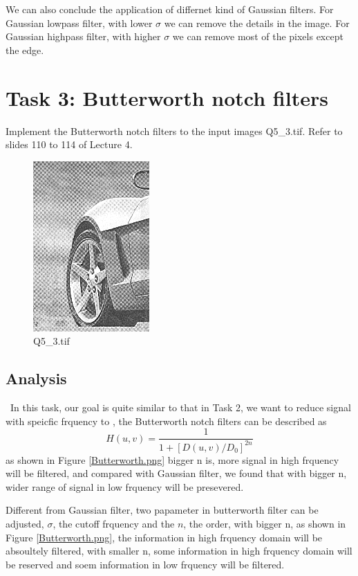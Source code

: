 \documentclass[
	12pt, %
]{style/fphw}
\begin{document}
We can also conclude the application of differnet kind of Gaussian filters. For Gaussian lowpass filter, with lower $\sigma$ we can remove the details in the image. For Gaussian highpass filter, with higher $\sigma$ we can remove most of the pixels except the edge.

\newpage
\section*{Task 3: Butterworth notch filters}

\begin{problem}
Implement the Butterworth notch filters to the input images Q5\_3.tif. Refer to slides 110 to 114 of Lecture 4.

\begin{figure}[H]
    \centering
    \includegraphics[width=0.3\linewidth]{plots/Q5_3.png}
    \caption{Q5\_3.tif}
    \label{Q5_3.tif}
\end{figure}

\end{problem}

\subsection*{Analysis} \
In this task, our goal is quite similar to that in Task 2, we want to reduce signal with speicfic frquency to , the Butterworth notch filters can be described as $$H(u,v)=\frac{1}{1+[D(u,v)/D_0]^{2n}}$$ as shown in Figure \ref{Butterworth.png} bigger n is, more signal in high frquency will be filtered, and compared with Gaussian filter, we found that with bigger n, wider range of signal in low frquency will be presevered.

Different from Gaussian filter, two papameter in butterworth filter can be adjusted, $\sigma$, the cutoff frquency and the $n$, the order, with bigger n, as shown in Figure \ref{Butterworth.png}, the information in high frquency domain will be absoultely filtered, with smaller n, some information in high frquency domain will be reserved and soem information in low frquency will be filtered.
\end{document}
